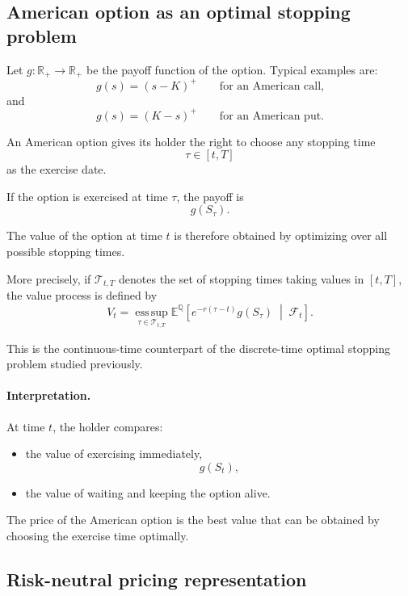 \documentclass[11pt]{article}
\newcommand{\R}{\mathbb{R}}
\newcommand{\Qbb}{\mathbb{Q}}
\newcommand{\E}{\mathbb{E}}
\theoremstyle{definition}
\theoremstyle{plain}
\begin{document}
\subsection{American option as an optimal stopping problem}

Let \(g:\R_+\to\R_+\) be the payoff function of the option.
Typical examples are:
\[
g(s)=(s-K)^+
\qquad\text{for an American call,}
\]
and
\[
g(s)=(K-s)^+
\qquad\text{for an American put.}
\]

An American option gives its holder the right to choose any stopping time
\[
\tau\in[t,T]
\]
as the exercise date.

If the option is exercised at time \(\tau\), the payoff is
\[
g(S_\tau).
\]

The value of the option at time \(t\) is therefore obtained by optimizing
over all possible stopping times.

More precisely, if \(\mathcal{T}_{t,T}\) denotes the set of stopping times
taking values in \([t,T]\), the value process is defined by
\[
V_t
=
\operatorname*{ess\,sup}_{\tau\in\mathcal{T}_{t,T}}
\E^{\Qbb}\!\left[
e^{-r(\tau-t)} g(S_\tau)
\;\middle|\;
\mathcal{F}_t
\right].
\]

This is the continuous-time counterpart of the discrete-time optimal
stopping problem studied previously.

\paragraph{Interpretation.}
At time \(t\), the holder compares:
\begin{itemize}[leftmargin=1.4em]
    \item the value of exercising immediately,
    \[
    g(S_t),
    \]
    \item the value of waiting and keeping the option alive.
\end{itemize}

The price of the American option is the best value that can be obtained
by choosing the exercise time optimally.

\subsection{Risk-neutral pricing representation}
\end{document}
